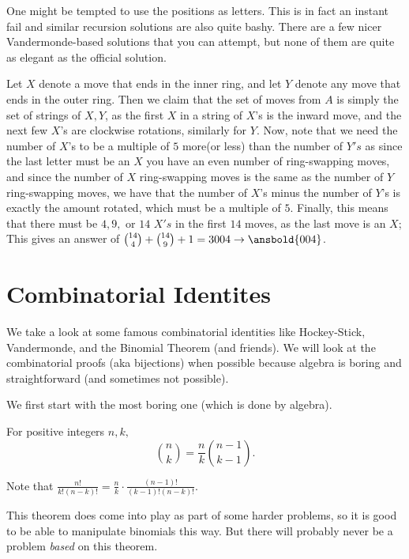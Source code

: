 One might be tempted to use the positions as letters. This is in fact an instant fail and similar recursion solutions are also quite bashy. There are a few nicer Vandermonde-based solutions that you can attempt, but none of them are quite as elegant as the official solution.
\begin{sol}
Let $X$ denote a move that ends in the inner ring, and let $Y$ denote any move that ends in the outer ring. Then we claim that the set of moves from $A$ is simply the set of strings of $X, Y$, as the first $X$ in a string of $X$'s is the inward move, and the next few $X$'s are clockwise rotations, similarly for $Y$. Now, note that we need the number of $X$'s to be a multiple of $5$  more(or less) than the number of $Y's$ as since the last letter must be an $X$ you have an even number of ring-swapping moves, and since the number of $X$ ring-swapping moves is the same as the number of $Y$ ring-swapping moves, we have that the number of $X$'s minus the number of $Y$'s is exactly the amount rotated, which must be a multiple of $5$. Finally, this means that there must be $4,9,$ or $14$ $X's$ in the first $14$ moves, as the last move is an $X$; This gives an answer of $\binom{14}4 + \binom{14}9 + 1 = 3004 \rightarrow \ansbold{004}$.
\end{sol}
\section{Combinatorial Identites}
We take a look at some famous combinatorial identities like Hockey-Stick, Vandermonde, and the Binomial Theorem (and friends). We will look at the combinatorial proofs (aka bijections) when possible because algebra is boring and straightforward (and sometimes not possible).

We first start with the most boring one (which is done by algebra).

\begin{theo}[Shift $1$]
For positive integers $n,k,$
\[\binom{n}{k}=\frac{n}{k}\binom{n-1}{k-1}.\]
\end{theo}

\begin{pro}
Note that $\frac{n!}{k!(n-k)!}=\frac{n}{k}\cdot\frac{(n-1)!}{(k-1)!(n-k)!}.$
\end{pro}

This theorem does come into play as part of some harder problems, so it is good to be able to manipulate binomials this way. But there will probably never be a problem \textit{based} on this theorem.

